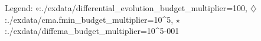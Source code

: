Legend: {\color{NavyBlue}$\circ$}:./exdata/differential\_evolution\_budget\_multiplier=100, {\color{Magenta}$\diamondsuit$}:./exdata/cma.fmin\_budget\_multiplier=10^5, {\color{Orange}$\star$}:./exdata/diffcma\_budget\_multiplier=10^5-001